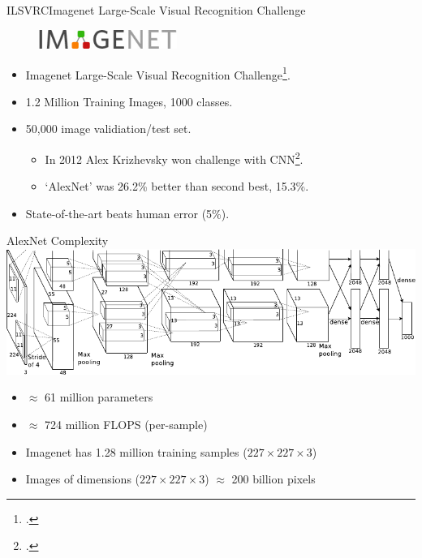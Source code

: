 \documentclass[t,xcolor=dvipsnames]{beamer}
\begin{document}
\begin{frame}{ILSVRC}{Imagenet Large-Scale Visual Recognition Challenge}

\begin{figure}
    \includegraphics[width=0.4\textwidth]{imagenetlogo}
\end{figure}
\begin{itemize}
    \item Imagenet Large-Scale Visual Recognition Challenge\footcite{ILSVRC2015}.
    \item 1.2 Million Training Images, 1000 classes.
    \item 50,000 image validiation/test set.
    \begin{itemize}
        \item In 2012 Alex Krizhevsky won challenge with CNN\footcite{Krizhevsky2012}.
        \item `AlexNet' was 26.2\% better than second best, 15.3\%.
    \end{itemize}
    \item State-of-the-art beats human error (5\%).
\end{itemize}    
\end{frame}


\begin{frame}{AlexNet Complexity}
\includegraphics[width=\columnwidth]{alexnet}
\begin{itemize}
\item $\approx$ 61 million parameters %
\item $\approx$ 724 million FLOPS (per-sample) %
\item Imagenet has 1.28 million training samples ($227 \times 227 \times 3$) %
\item Images of dimensions  ($227 \times 227 \times 3$) $\approx$ 200 billion pixels %
\end{itemize}
\end{frame}
\end{document}
